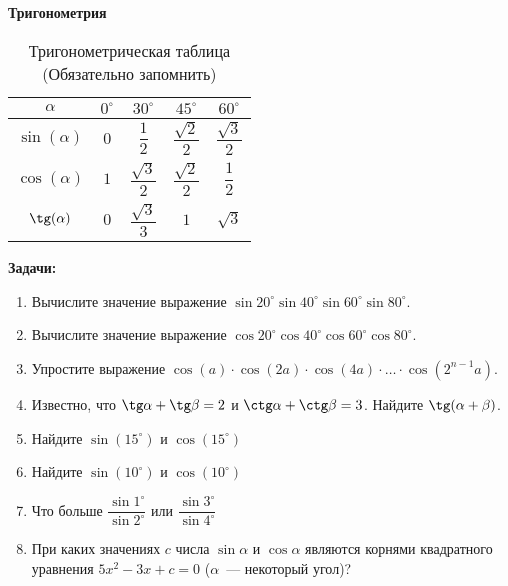 \documentclass{article}
\begin{document}
    \large

    \begin{center}
        \textbf{Тригонометрия}
    \end{center}

    \begin{table}[h]
        \label{tab:table-2}
        \centering
        \begin{tabular}{|c|c|c|c|c|}
            \hline
            \textbf{$\alpha$} & \textbf{$0^\circ$} & \textbf{$30^\circ$}       & \textbf{$45^\circ$}       & \textbf{$60^\circ$}   \\\hline
            $\sin(\alpha)$    & $0$            & $\dfrac{1}{2}$        & $\dfrac{\sqrt{2}}{2}$ & $\dfrac{\sqrt{3}}{2}$ \\[3mm]\hline
            $\cos(\alpha)$    & $1$            & $\dfrac{\sqrt{3}}{2}$ & $\dfrac{\sqrt{2}}{2}$ & $\dfrac{1}{2}$ \\[3mm]\hline
            $\tg(\alpha)$     & $0$            & $\dfrac{\sqrt{3}}{3}$ & $1$                   & $\sqrt{3}$ \\[3mm]\hline
        \end{tabular}
        \caption{Тригонометрическая таблица (Обязательно запомнить)}
    \end{table}


    \textbf{Задачи:}

    \begin{enumerate}[label*=\protect\fbox{\arabic{enumi}}]

        \setcounter{enumi}{0}

        \item Вычислите значение выражение $\sin 20^\circ \sin 40^\circ \sin 60^\circ \sin 80^\circ$.

        \item Вычислите значение выражение $\cos 20^\circ \cos 40^\circ \cos 60^\circ \cos 80^\circ$.

        \item Упростите выражение $\cos (a) \cdot \cos (2a) \cdot \cos (4a) \cdot \dotsc \cdot \cos (2^{n-1}a)$.

        \item Известно, что  $\tg \alpha + \tg \beta = 2$ и $\ctg \alpha + \ctg \beta = 3$.
        Найдите $ \tg (\alpha + \beta) $.

        \item Найдите $ \sin(15^\circ) $ и $ \cos(15^\circ) $

        \item Найдите $ \sin(10^\circ) $ и $ \cos(10^\circ) $

        \item Что больше $\dfrac{\sin1^\circ}{\sin2^\circ}$ или $\dfrac{\sin3^\circ}{\sin4^\circ}$

        \item При каких значениях $c$ числа $ \sin \alpha $ и $ \cos \alpha $ являются корнями квадратного уравнения  $5x^2 - 3x + c = 0$  ($ \alpha $~--- некоторый угол)?
    \end{enumerate}
\end{document}
